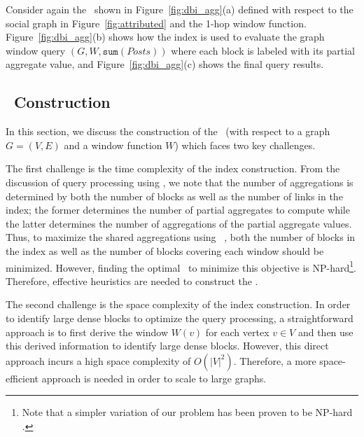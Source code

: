 Consider again the \DBIndex\ shown in Figure~\ref{fig:dbi_agg}(a) 
defined with respect to the social graph in Figure~\ref{fig:attributed} and the 1-hop window function.
Figure~\ref{fig:dbi_agg}(b) shows how the index is used to evaluate the graph window query $(G, W, \mathtt{sum}(Posts))$
where each block is labeled with its partial aggregate value, and Figure~\ref{fig:dbi_agg}(c) shows the final query results.



\subsection{\DBIndex\  Construction} 

In this section, we discuss the construction of the \DBIndex\ (with respect to a graph $G=(V,E)$ and a window function $W$) which faces two key challenges.

The first challenge is the time complexity of the index construction. 
From the discussion of query processing using \DBIndex , 
we note that the number of aggregations is determined by both the number of blocks as well as the number of links in the index; 
the former determines the number of partial aggregates to compute
while the latter determines the number of aggregations of the partial aggregate values.
Thus, to maximize the shared aggregations using \DBIndex\ , both the number of blocks in the index as well as the number of blocks covering each window should be minimized. 
However, finding the optimal \DBIndex\ to minimize this objective is NP-hard\footnote{
Note that a simpler variation of our problem has been proven to be NP-hard \cite{vassilevska2004finding}.}.
Therefore, effective heuristics are needed to construct the \DBIndex.

The second challenge is the space complexity of the index construction.
In order to identify large dense blocks to optimize the query processing,
a straightforward approach is to first derive the window $W(v)$ for each vertex $v \in V$ and
then use this derived information to identify large dense blocks.
However, this direct approach incurs a high space complexity of $O(|V|^2)$.
Therefore, a more space-efficient approach is needed in order to scale to large graphs.

